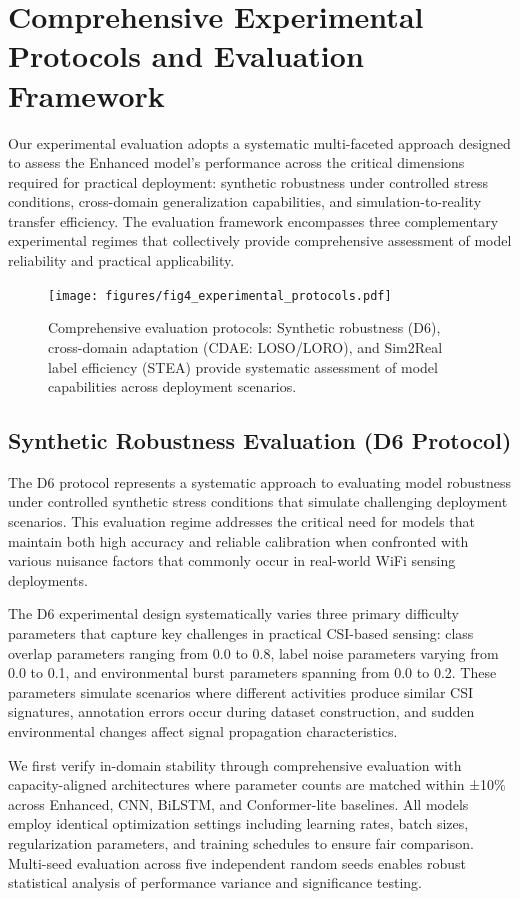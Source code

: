 \documentclass[journal]{IEEEtran}
\begin{document}
\section{Comprehensive Experimental Protocols and Evaluation Framework}

Our experimental evaluation adopts a systematic multi-faceted approach designed to assess the Enhanced model's performance across the critical dimensions required for practical deployment: synthetic robustness under controlled stress conditions, cross-domain generalization capabilities, and simulation-to-reality transfer efficiency. The evaluation framework encompasses three complementary experimental regimes that collectively provide comprehensive assessment of model reliability and practical applicability.

\begin{figure}[t]
\centering
\texttt{[image: figures/fig4\_experimental\_protocols.pdf]}
\caption{Comprehensive evaluation protocols: Synthetic robustness (D6), cross-domain adaptation (CDAE: LOSO/LORO), and Sim2Real label efficiency (STEA) provide systematic assessment of model capabilities across deployment scenarios.}
\label{fig:protocols}
\end{figure}

\subsection{Synthetic Robustness Evaluation (D6 Protocol)}

The D6 protocol represents a systematic approach to evaluating model robustness under controlled synthetic stress conditions that simulate challenging deployment scenarios. This evaluation regime addresses the critical need for models that maintain both high accuracy and reliable calibration when confronted with various nuisance factors that commonly occur in real-world WiFi sensing deployments.

The D6 experimental design systematically varies three primary difficulty parameters that capture key challenges in practical CSI-based sensing: class overlap parameters ranging from 0.0 to 0.8, label noise parameters varying from 0.0 to 0.1, and environmental burst parameters spanning from 0.0 to 0.2. These parameters simulate scenarios where different activities produce similar CSI signatures, annotation errors occur during dataset construction, and sudden environmental changes affect signal propagation characteristics.

We first verify in-domain stability through comprehensive evaluation with capacity-aligned architectures where parameter counts are matched within ±10\% across Enhanced, CNN, BiLSTM, and Conformer-lite baselines. All models employ identical optimization settings including learning rates, batch sizes, regularization parameters, and training schedules to ensure fair comparison. Multi-seed evaluation across five independent random seeds enables robust statistical analysis of performance variance and significance testing.
\end{document}
